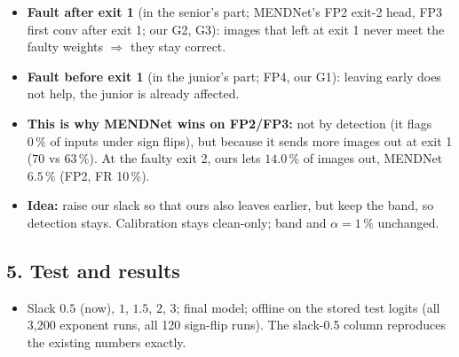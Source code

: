 \documentclass[10pt,a4paper]{article}
\begin{document}
\begin{itemize}
  \item \textbf{Fault after exit 1} (in the senior's part; MENDNet's FP2 exit-2 head, FP3 first conv after exit 1;
        our G2, G3): images that left at exit 1 never meet the faulty weights $\Rightarrow$ they stay correct.
  \item \textbf{Fault before exit 1} (in the junior's part; FP4, our G1): leaving early does not help, the junior is
        already affected.
  \item \textbf{This is why MENDNet wins on FP2/FP3:} not by detection (it flags $0\,\%$ of inputs under sign flips),
        but because it sends more images out at exit 1 ($70$ vs $63\,\%$). At the faulty exit 2, ours lets
        $14.0\,\%$ of images out, MENDNet $6.5\,\%$ (FP2, FR 10\,\%).
  \item \textbf{Idea:} raise our slack so that ours also leaves earlier, but keep the band, so detection stays.
        Calibration stays clean-only; band and $\alpha=1\,\%$ unchanged.
\end{itemize}

\subsection*{5. Test and results}

\begin{itemize}
  \item Slack $0.5$ (now), $1$, $1.5$, $2$, $3$; final model; offline on the stored test logits (all 3{,}200
        exponent runs, all 120 sign-flip runs). The slack-0.5 column reproduces the existing numbers exactly.
\end{itemize}
\end{document}
